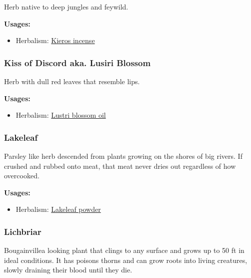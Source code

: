 Herb native to deep jungles and feywild.

\vspace{5mm}

\textbf{Usages:}

\begin{itemize}[noitemsep]
\item[] Herbalism: \hyperref[Kieros incense]{Kieros incense}
\end{itemize}

\subsubsection{Kiss of Discord aka. Lusiri Blossom}
\label{Kiss of Discord}

Herb with dull red leaves that resemble lips.

\vspace{5mm}

\textbf{Usages:}

\begin{itemize}[noitemsep]
\item[] Herbalism: \hyperref[Lustri blossom oil]{Lustri blossom oil}
\end{itemize}

\subsubsection{Lakeleaf}
\label{Lakeleaf}

Parsley like herb descended from plants growing on the shores of big rivers. If crushed and rubbed onto meat, that meat never dries out regardless of how overcooked.

\vspace{5mm}

\textbf{Usages:}

\begin{itemize}[noitemsep]
\item[] Herbalism: \hyperref[Lakeleaf powder]{Lakeleaf powder}
\end{itemize}

\subsubsection{Lichbriar}
\label{Lichbriar}

Bougainvillea looking plant that clings to any surface and grows up to 50 ft in ideal conditions. It has poisons thorns and can grow roots into living creatures, slowly draining their blood until they die. 

